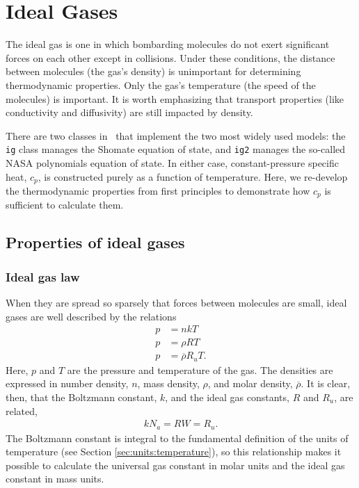 \chapter{Ideal Gases}\label{ch:ig}

The ideal gas is one in which bombarding molecules do not exert significant forces on each other except in collisions.  Under these conditions, the distance between molecules (the gas's density) is unimportant for determining thermodynamic properties.  Only the gas's temperature (the speed of the molecules) is important.  It is worth emphasizing that transport properties (like conductivity and diffusivity) are still impacted by density.

There are two classes in \PM\ that implement the two most widely used models: the \verb|ig| class manages the Shomate equation of state, and \verb|ig2| manages the so-called NASA polynomials equation of state.  In either case, constant-pressure specific heat, $c_p$, is constructed purely as a function of temperature.  Here, we re-develop the thermodynamic properties from first principles to demonstrate how $c_p$ is sufficient to calculate them.

\section{Properties of ideal gases}

\subsection{Ideal gas law}

When they are spread so sparsely that forces between molecules are small, ideal gases are well described by the relations
\begin{subequations}
\begin{align}
p &= n k T\label{eqn:ig:k}\\
p &= \rho R T\label{eqn:ig:r}\\
p &= \overline{\rho} R_u T\label{eqn:ig:ru}.
\end{align}
\end{subequations}
Here, $p$ and $T$ are the pressure and temperature of the gas.  The densities are expressed in number density, $n$, mass density, $\rho$, and molar density, $\overline{\rho}$.  It is clear, then, that the Boltzmann constant, $k$, and the ideal gas constants, $R$ and $R_u$, are related,
\begin{align}
k N_a = R W = R_u.
\end{align}
The Boltzmann constant is integral to the fundamental definition of the units of temperature (see Section \ref{sec:units:temperature}), so this relationship makes it possible to calculate the universal gas constant in molar units and the ideal gas constant in mass units.

